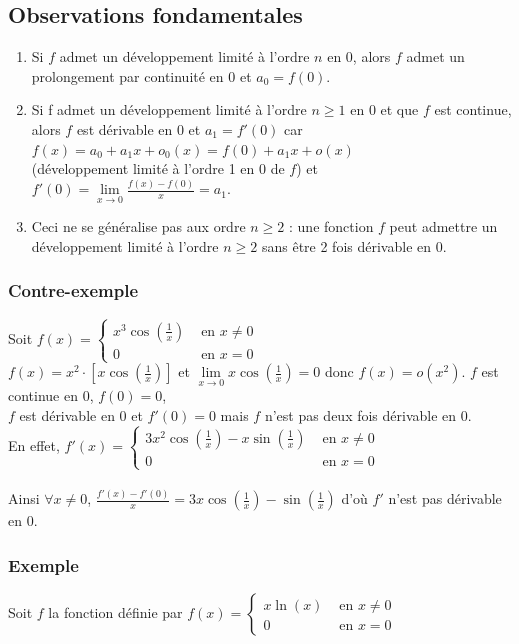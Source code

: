 \documentclass[a4paper,10pt]{book} %
\newcommand{\dl}{développement limité }
\begin{document}
\subsection{Observations fondamentales}
\begin{enumerate}
\item Si $f$ admet un \dl à l'ordre $n$ en 0, alors $f$ admet un prolongement par continuité en 0 et $a_0=f(0)$.\\

\item Si f admet un \dl à l'ordre $n\geq 1$ en 0 et que $f$ est continue, alors $f$ est dérivable en 0 et $a_1=f'(0)$ car $f(x)=a_0+a_1x+o_0(x)=f(0)+a_1x+o(x)$\\(\dl à l'ordre 1 en 0 de $f$) et $f'(0)=\lim\limits_{x\rightarrow 0}\frac{f(x)-f(0)}{x}=a_1$.\\

\item Ceci ne se généralise pas aux ordre $n\geq 2$ : une fonction $f$ peut admettre un \dl à l'ordre $n\geq 2$ sans être 2 fois dérivable en 0.
\end{enumerate}

\subsubsection{Contre-exemple}
Soit $f(x)=\left\{\begin{array}{cc}
x^3\cos(\frac{1}{x})&\text{ en } x\neq 0 \\
0&\text{ en }x=0
\end{array}\right.$\\

$f(x)=x^2\cdot [x\cos(\frac{1}{x})]$ et $\lim\limits_{x\rightarrow 0}x\cos(\frac{1}{x})=0$ donc $f(x)=o(x^2)$. $f$ est continue en 0, $f(0)=0$,\\$f$ est dérivable en 0 et $f'(0)=0$ mais $f$ n'est pas deux fois dérivable en 0.\\

En effet, $f'(x)=\left\{\begin{array}{cc}
3x^2\cos(\frac{1}{x})-x\sin(\frac{1}{x})&\text{ en }x\neq 0\\ 0&\text{ en }x=0
\end{array}\right.$\\\\
Ainsi $\forall x\neq 0$, $\frac{f'(x)-f'(0)}{x}=3x\cos(\frac{1}{x})-\sin(\frac{1}{x})$ d'où $f'$ n'est pas dérivable en 0.

\subsubsection{Exemple}
Soit $f$ la fonction définie par $f(x)=\left\{\begin{array}{cc}
x\ln(x)&\text{ en }x\neq 0\\
0&\text{ en }x=0
\end{array}\right.$
\end{document}
